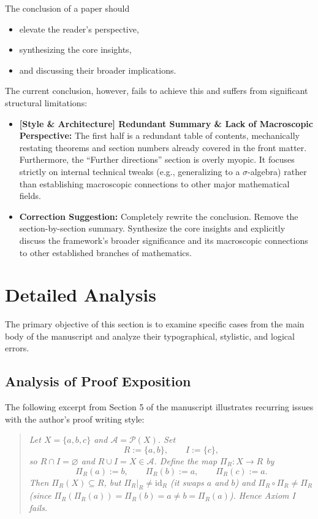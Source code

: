 \documentclass[11pt, a4paper]{article}
\begin{document}
The conclusion of a paper should 
\begin{itemize}
    \item elevate the reader's perspective,
    \item synthesizing the core insights,
    \item and discussing their broader implications.
\end{itemize}

The current conclusion, however, fails to achieve this and suffers from significant structural limitations:

\begin{itemize}
    \item \textcolor{RustOrange}{\textbf{[Style \& Architecture] Redundant Summary \& Lack of Macroscopic Perspective:}} The first half is a redundant table of contents, mechanically restating theorems and section numbers already covered in the front matter. Furthermore, the ``Further directions'' section is overly myopic. It focuses strictly on internal technical tweaks (e.g., generalizing to a $\sigma$-algebra) rather than establishing macroscopic connections to other major mathematical fields.
    
    \item \textbf{Correction Suggestion:} Completely rewrite the conclusion. Remove the section-by-section summary. Synthesize the core insights and explicitly discuss the framework's broader significance and its macroscopic connections to other established branches of mathematics.
\end{itemize}


\section{Detailed Analysis}

The primary objective of this section is to examine specific cases from the main body of the manuscript and analyze their typographical, stylistic, and logical errors.

\subsection{Analysis of Proof Exposition}

The following excerpt from Section 5 of the manuscript illustrates recurring issues with the author's proof writing style:

\begin{quote}
    \small \textit{Let $X=\{a,b,c\}$ and $\mathcal{A}=\mathcal{P}(X)$. Set
    $$R:=\{a,b\},\qquad I:=\{c\},$$
    so $R\cap I=\varnothing$ and $R\cup I=X\in\mathcal{A}$. Define the map $\Pi_R:X\to R$ by
    $$\Pi_R(a):=b,\qquad \Pi_R(b):=a,\qquad \Pi_R(c):=a.$$
    Then $\Pi_R(X)\subseteq R$, but $\Pi_R|_R\ne\mathrm{id}_R$ (it swaps $a$ and $b$) and $\Pi_R\circ\Pi_R\ne\Pi_R$ (since $\Pi_R(\Pi_R(a))=\Pi_R(b)=a\ne b=\Pi_R(a)$). Hence Axiom I fails.}
\end{quote}
\end{document}
